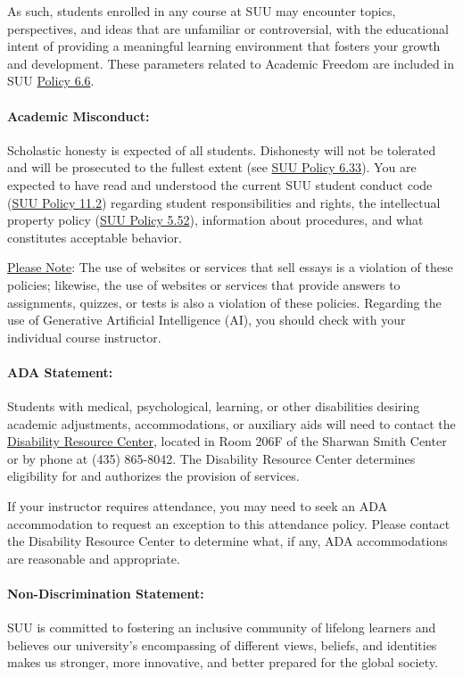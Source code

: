 \documentclass[12pt, letterpaper]{article}
\begin{document}
\noindent
As such, students enrolled in any course at SUU may encounter topics, perspectives, and ideas that are unfamiliar or controversial, with the educational intent of providing a meaningful learning environment that fosters your growth and development. These parameters related to Academic Freedom are included in SUU \href{https://www.suu.edu/policies/06/06.html}{Policy 6.6}.

\paragraph{Academic Misconduct:}
Scholastic honesty is expected of all students. Dishonesty will not be tolerated and will be prosecuted to the fullest extent (see \href{https://www.suu.edu/policies/06/33.html}{SUU Policy 6.33}). You are expected to have read and understood the current SUU student conduct code (\href{https://www.suu.edu/policies/11/02.html}{SUU Policy 11.2}) regarding student responsibilities and rights, the intellectual property policy (\href{https://www.suu.edu/policies/05/52.html}{SUU Policy 5.52}), information about procedures, and what constitutes acceptable behavior.

\noindent
\underline{Please Note}: The use of websites or services that sell essays is a violation of these policies; likewise, the use of websites or services that provide answers to assignments, quizzes, or tests is also a violation of these policies. Regarding the use of Generative Artificial Intelligence (AI), you should check with your individual course instructor.

\paragraph{ADA Statement:}
Students with medical, psychological, learning, or other disabilities desiring academic adjustments, accommodations, or auxiliary aids will need to contact the \href{https://www.suu.edu/disabilityservices/}{Disability Resource Center}, located in Room 206F of the Sharwan Smith Center or by phone at (435) 865-8042. The Disability Resource Center determines eligibility for and authorizes the provision of services.

\noindent
If your instructor requires attendance, you may need to seek an ADA accommodation to request an exception to this attendance policy. Please contact the Disability Resource Center to determine what, if any, ADA accommodations are reasonable and appropriate.

\paragraph{Non-Discrimination Statement:}
SUU is committed to fostering an inclusive community of lifelong learners and believes our university's encompassing of different views, beliefs, and identities makes us stronger, more innovative, and better prepared for the global society.
\end{document}
